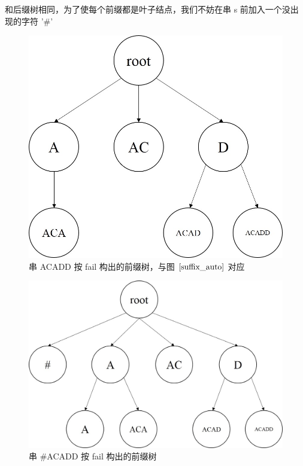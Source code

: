 \documentclass{article}
\begin{document}
和后缀树相同，为了使每个前缀都是叶子结点，我们不妨在串 s 前加入一个没出现的字符 '\#'

\begin{figure}
  \centering
  \includegraphics[scale=0.6]{suffix_auto2.jpg}
  \caption{串 ACADD 按 fail 构出的前缀树，与图 $\ref{suffix_auto}$ 对应}
  \label{suffix_auto2}
\end{figure}


\begin{figure}
  \centering
  \includegraphics[scale=0.6]{suffix_auto3.jpg}
  \caption{串 \#ACADD 按 fail 构出的前缀树}
  \label{suffix_auto3}
\end{figure}
\end{document}
